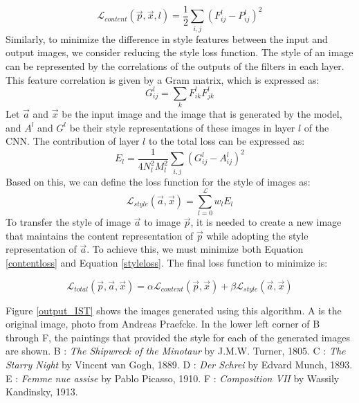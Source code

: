\begin{equation}
    \label{contentloss}
    \mathcal{ L}_{content}(\vec{p}, \vec{x}, l)=\frac{1}{2} \sum_{i, j}\left(F_{i j}^l-P_{i j}^l\right)^2
\end{equation}
Similarly, to minimize the difference in style features between the input and
output images, we consider reducing the style loss function. The style of an 
image can be represented by the correlations of the outputs of the filters in 
each layer. This feature correlation is given by a Gram matrix, which is 
expressed as:
\begin{equation}
    G_{i j}^l = \sum_k F_{i k}^l F_{j k}^l 
    \label{gram}
\end{equation}
Let $\vec{a}$ and $\vec{x}$ be the input image and the image that is generated by
the model, and $A^l$ and $G^l$ be their style representations of these images in 
layer $l$ of the CNN. The contribution of layer $l$ to the total loss can be 
expressed as:
\begin{equation}
    E_l=\frac{1}{4 N_l^2 M_l^2} \sum_{i, j}\left(G_{i j}^l-A_{i j}^l\right)^2
\end{equation}
Based on this, we can define the loss function for the style of images as:
\begin{equation}
    \label{styleloss}
    \mathcal{ L}_{style}(\vec{a}, \vec{x})=\sum_{l=0}^\mathcal{ L}w_{l}E_{l}
\end{equation}
To transfer the style of image $\vec{a}$ to image $\vec{p}$, it is needed to 
create a new image that maintains the content representation of $\vec{p}$ 
while adopting the style representation of $\vec{a}$. To achieve this, we must 
minimize both Equation \eqref{contentloss} and Equation \eqref{styleloss}.
The final loss function to minimize is:

\begin{equation}
    \mathcal{ L}_{total}(\vec{p}, \vec{a}, \vec{x})=\alpha\mathcal{ L}_{content}(\vec{p}, \vec{x})+\beta\mathcal{ L}_{style}(\vec{a}, \vec{x})
\end{equation}


Figure \ref{output_IST} shows the images generated using this algorithm.
A is the original image, photo from Andreas Praefcke.
In the lower left corner of B through F, the paintings that provided the style 
for each of the generated images are shown.
B : \textit{The Shipwreck of the Minotaur} by J.M.W. Turner, 1805. 
C : \textit{The Starry Night} by Vincent van Gogh, 1889. 
D : \textit{Der Schrei} by Edvard Munch, 1893. 
E : \textit{Femme nue assise} by Pablo Picasso, 1910. 
F : \textit{Composition VII} by Wassily Kandinsky, 1913.

